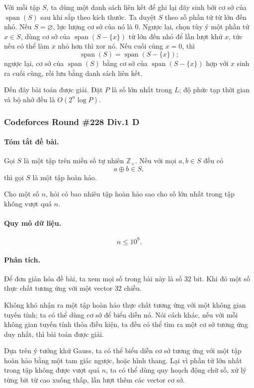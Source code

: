 \documentclass[11pt]{article}
\begin{document}
Với mỗi tập \(S\), ta dùng một danh sách liên kết để ghi lại dãy sinh bởi cơ sở
của \(\operatorname{span}(S)\) sau khi sắp theo kích thước. Ta duyệt \(S\) theo
số phần tử từ lớn đến nhỏ. Nếu \(S=\varnothing\), lực lượng cơ sở của nó là
\(0\). Ngược lại, chọn tùy ý một phần tử \(x\in S\), dùng cơ sở của
\(\operatorname{span}(S-\{x\})\) từ lớn đến nhỏ để lần lượt khử \(x\), tức nếu
có thể làm \(x\) nhỏ hơn thì xor nó. Nếu cuối cùng \(x=0\), thì
\[
  \operatorname{span}(S)=\operatorname{span}(S-\{x\});
\]
ngược lại, cơ sở của \(\operatorname{span}(S)\) bằng cơ sở của
\(\operatorname{span}(S-\{x\})\) hợp với \(x\) sinh ra cuối cùng, rồi lưu bằng
danh sách liên kết.

Đến đây bài toán được giải. Đặt \(P\) là số lớn nhất trong \(L\); độ phức tạp
thời gian và bộ nhớ đều là \(O(2^n\log P)\).

\subsubsection{Codeforces Round \#228 Div.1 D}

\paragraph{Tóm tắt đề bài.}
Gọi \(S\) là một tập trên miền số tự nhiên \(\mathbb{Z}_+\). Nếu với mọi
\(a,b\in S\) đều có
\[
  a\oplus b\in S,
\]
thì gọi \(S\) là một tập hoàn hảo.

Cho một số \(n\), hỏi có bao nhiêu tập hoàn hảo sao cho số lớn nhất trong tập
không vượt quá \(n\).

\paragraph{Quy mô dữ liệu.}
\[
  n\le10^9.
\]

\paragraph{Phân tích.}
Để đơn giản hóa đề bài, ta xem mọi số trong bài này là số \(32\) bit. Khi đó một
số thực chất tương ứng với một vector \(32\) chiều.

Không khó nhận ra một tập hoàn hảo thực chất tương ứng với một không gian tuyến
tính; ta có thể dùng cơ sở để biểu diễn nó. Nói cách khác, nếu với mỗi không
gian tuyến tính thỏa điều kiện, ta đều có thể tìm ra một cơ sở tương ứng duy
nhất, thì bài toán được giải.

Dựa trên ý tưởng khử Gauss, ta có thể biểu diễn cơ sở tương ứng với một tập hoàn
hảo bằng một tam giác ngược, hoặc hình thang. Lại vì phần tử lớn nhất trong tập
không được vượt quá \(n\), ta có thể dùng quy hoạch động chữ số, xử lý từng bit
từ cao xuống thấp, lần lượt thêm các vector cơ sở.
\end{document}
